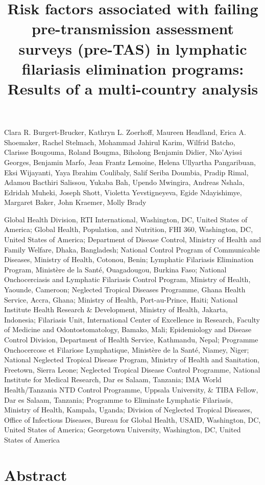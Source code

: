 \documentclass[11pt,a4paper]{article}
\title{Risk factors associated with failing pre-transmission assessment surveys (pre-TAS) in lymphatic filariasis elimination programs: Results of a multi-country analysis}
\begin{document}
\maketitle

Clara R. Burgert-Brucker, Kathryn L. Zoerhoff, Maureen Headland, Erica A. Shoemaker, Rachel Stelmach, Mohammad Jahirul Karim, Wilfrid Batcho, Clarisse Bougouma, Roland Bougma, Biholong Benjamin Didier, Nko'Ayissi Georges, Benjamin Marfo, Jean Frantz Lemoine, Helena Ullyartha Pangaribuan, Eksi Wijayanti, Yaya Ibrahim Coulibaly, Salif Seriba Doumbia, Pradip Rimal, Adamou Bacthiri Salissou, Yukaba Bah, Upendo Mwingira, Andreas Nshala, Edridah Muheki, Joseph Shott, Violetta Yevstigneyeva, Egide Ndayishimye, Margaret Baker, John Kraemer, Molly Brady

Global Health Division, RTI International, Washington, DC, United States of America; Global Health, Population, and Nutrition, FHI 360, Washington, DC, United States of America; Department of Disease Control, Ministry of Health and Family Welfare, Dhaka, Bangladesh; National Control Program of Communicable Diseases, Ministry of Health, Cotonou, Benin; Lymphatic Filariasis Elimination Program, Ministère de la Santé, Ouagadougou, Burkina Faso; National Onchocerciasis and Lymphatic Filariasis Control Program, Ministry of Health, Yaounde, Cameroon; Neglected Tropical Diseases Programme, Ghana Health Service, Accra, Ghana; Ministry of Health, Port-au-Prince, Haiti; National Institute Health Research \& Development, Ministry of Health, Jakarta, Indonesia; Filariasis Unit, International Center of Excellence in Research, Faculty of Medicine and Odontostomatology, Bamako, Mali; Epidemiology and Disease Control Division, Department of Health Service, Kathmandu, Nepal; Programme Onchocercose et Filariose Lymphatique, Ministère de la Santé, Niamey, Niger; National Neglected Tropical Disease Program, Ministry of Health and Sanitation, Freetown, Sierra Leone; Neglected Tropical Disease Control Programme, National Institute for Medical Research, Dar es Salaam, Tanzania; IMA World Health/Tanzania NTD Control Programme, Uppsala University, \& TIBA Fellow, Dar es Salaam, Tanzania; Programme to Eliminate Lymphatic Filariasis, Ministry of Health, Kampala, Uganda; Division of Neglected Tropical Diseases, Office of Infectious Diseases, Bureau for Global Health, USAID, Washington, DC, United States of America; Georgetown University, Washington, DC, United States of America

\section{Abstract}
\end{document}
